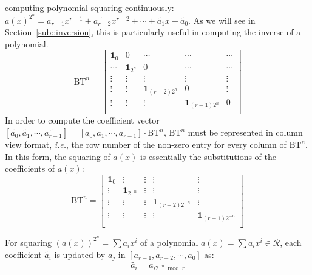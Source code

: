 \documentclass[runningheads]{llncs}
\begin{document}
computing polynomial squaring continuously:
$a(x)^{2^n}=\widetilde{a_{r-1}}x^{r-1}+\widetilde{a_{r-2}}x^{r-2}+\cdots + \widetilde{a_{1}}x +\widetilde{a_0}$.
As we will see in Section~\ref{sub::inversion},
this is particularly useful in computing the
inverse of a polynomial.
\[
\text{BT}^n =
\left[ \begin{array}{ccccc}
\mathbf{1}_{0}&0&\cdots&\cdots&\cdots  \\
\cdots&\mathbf{1}_{2^n}&0 &\cdots&\cdots \\
\vdots&\vdots&\vdots&\vdots&\vdots\\
\vdots&\vdots&\mathbf{1}_{(r-2)2^n}&0&\vdots\\
\vdots&\vdots&\vdots&\mathbf{1}_{(r-1)2^n}&0\\
\end{array}
\right ]
\]
%
In order to compute the coefficient vector $[\widetilde{a_{0}},\widetilde{a_{1}},\cdots,\widetilde{a_{r-1}}]=[{a_{0}},{a_{1}},\cdots,{a_{r-1}}]
\cdot \text{BT}^n$, $\text{BT}^n$ must be represented in column view format, \textit{i.e.},
the row number of the non-zero entry for every column of $\text{BT}^n$. In this form, the squaring of $a(x)$ is essentially the substitutions of the coefficients of $a(x)$:
\[
\text{BT}^n =
\left[ \begin{array}{ccccc}
\mathbf{1}_{0}&\vdots& \vdots&\vdots&\vdots \\
\vdots&\mathbf{1}_{2^{-n}}&\vdots&\vdots&\vdots\\
\vdots&\vdots&\vdots&\mathbf{1}_{(r-2)2^{-n}}&\vdots\\
\vdots&\vdots&\vdots&\vdots&\mathbf{1}_{(r-1)2^{-n}}\\
\end{array}
\right ]
\]

\begin{theorem}
For squaring $(a(x))^{2^n}=\sum\widetilde{a_{i}}x^i$ of a polynomial $a(x)=\sum a_ix^i \in \mathcal{R}$, each coefficient $\widetilde{a_{i}}$ is updated by $a_{j}$ in $[{a_{r-1}},{a_{r-2}},\cdots,{a_0}]$ as:
\[
    \widetilde{a_{i}} = a_{i2^{-n}\bmod r}
\]
\end{theorem}
\end{document}

